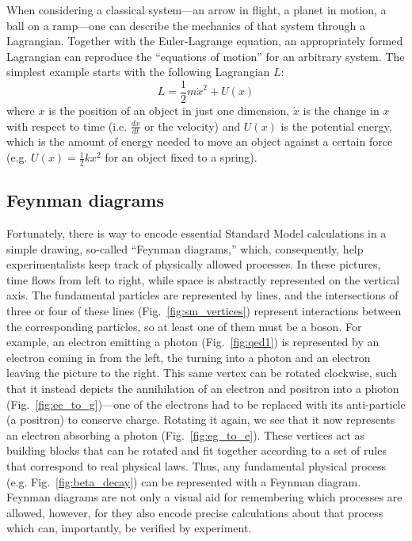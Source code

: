 When considering a classical system---an arrow in flight, a planet in motion, a ball on a ramp---one can describe the mechanics of that system through a Lagrangian. 
Together with the Euler-Lagrange equation, an appropriately formed Lagrangian can reproduce the ``equations of motion'' for an arbitrary system. 
The simplest example starts with the following Lagrangian $L$:
\begin{equation}
    L = \frac{1}{2}m\dot{x}^2 + U(x)
\end{equation}
where $x$ is the position of an object in just one dimension, $\dot{x}$ is the change in $x$ with respect to time (i.e. $\frac{dx}{dt}$ or the velocity) and $U(x)$ is the potential energy, which is the amount of energy needed to move an object against a certain force (e.g. $U(x) = \frac{1}{2}kx^2$ for an object fixed to a spring). 

\subsection{Feynman diagrams}
Fortunately, there is way to encode essential Standard Model calculations in a simple drawing, so-called ``Feynman diagrams,'' which, consequently, help experimentalists keep track of physically allowed processes. 
In these pictures, time flows from left to right, while space is abstractly represented on the vertical axis\footnotemark{}. 
The fundamental particles are represented by lines, and the intersections of three or four of these lines (Fig.~\ref{fig:sm_vertices}) represent interactions between the corresponding particles, so at least one of them must be a boson. 
For example, an electron emitting a photon (Fig.~\ref{fig:qed1}) is represented by an electron coming in from the left, the turning into a photon and an electron leaving the picture to the right. 
This same vertex can be rotated clockwise, such that it instead depicts the annihilation of an electron and positron into a photon (Fig.~\ref{fig:ee_to_g})---one of the electrons had to be replaced with its anti-particle (a positron) to conserve charge. 
Rotating it again, we see that it now represents an electron absorbing a photon (Fig.~\ref{fig:eg_to_e}). 
These vertices act as building blocks that can be rotated and fit together according to a set of rules that correspond to real physical laws. 
Thus, any fundamental physical process (e.g. Fig.~\ref{fig:beta_decay}) can be represented with a Feynman diagram. 
Feynman diagrams are not only a visual aid for remembering which processes are allowed, however, for they also encode precise calculations about that process which can, importantly, be verified by experiment.

